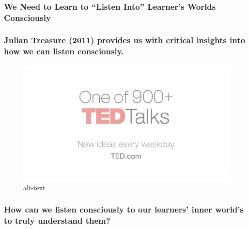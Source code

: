 \documentclass[
]{book}
\begin{document}
\hypertarget{we-need-to-learn-to-listen-into-learners-worlds-consciously}{%
\subsubsection*{We Need to Learn to ``Listen Into'' Learner's Worlds Consciously}\label{we-need-to-learn-to-listen-into-learners-worlds-consciously}}

\hypertarget{julian-treasure-2011-provides-us-with-critical-insights-into-how-we-can-listen-consciously.}{%
\subsubsection*{Julian Treasure (2011) provides us with critical insights into how we can listen consciously.}\label{julian-treasure-2011-provides-us-with-critical-insights-into-how-we-can-listen-consciously.}}

\begin{figure}
\centering
\includegraphics{assets/presentations/coaching/ted.jpg}
\caption{alt-text}
\end{figure}

\hypertarget{how-can-we-listen-consciously-to-our-learners-inner-worlds-to-truly-understand-them}{%
\subsubsection*{How can we listen consciously to our learners' inner world's to truly understand them?}\label{how-can-we-listen-consciously-to-our-learners-inner-worlds-to-truly-understand-them}}
\end{document}
